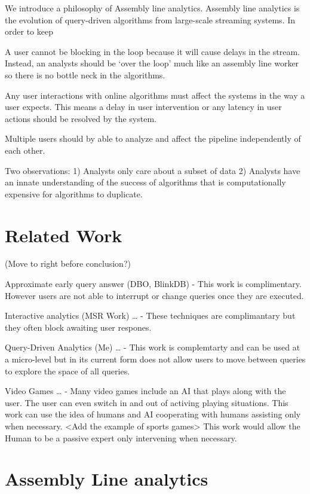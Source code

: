 \documentclass{sig-alternate}
\begin{document}
We introduce a philosophy of Assembly line analytics. Assembly line analytics is the evolution of query-driven
algorithms from large-scale streaming systems.
In order to keep 

A user cannot be blocking in the loop because it will cause delays in the stream.
Instead, an analysts should be `over the loop' much like an assembly line worker so there is no bottle neck
 in the algorithms.

Any user interactions with online algorithms must affect the systems in the way a user expects.
This means a delay in user intervention or any latency in user actions should be resolved by the system.

Multiple users should by able to analyze and affect the pipeline independently of each other.


Two observations:
1) Analysts only care about a subset of data
2) Analysts have an innate understanding of the success of algorithms that is computationally expensive for algorithms to duplicate.


\section{Related Work} (Move to right before conclusion?)

Approximate early query answer (DBO, BlinkDB)
  - This work is complimentary. However users are not able to interrupt or change queries once they are executed.

Interactive analytics (MSR Work) \ldots
  - These techniques are complimantary but they often block awaiting user respones.

Query-Driven Analytics (Me) \ldots
  - This work is complemtarty and can be used at a micro-level but in its current form does not allow users
to move between queries to explore the space of all queries.

Video Games \ldots
 - Many video games include an AI that plays along with the user.
The user can even switch in and out of activing playing situations.
This work can use the idea of humans and AI cooperating with humans assisting only when necessary.
<Add the example of sports games>
This work would allow the Human to be a passive expert only intervening when necessary.

\section{Assembly Line analytics}
\end{document}
